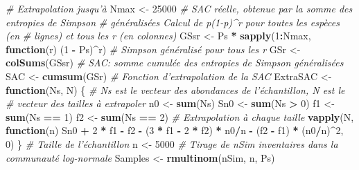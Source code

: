 \documentclass[
  11pt,
  french,
  a4paper,
  extrafontsizes,onecolumn,openright
  ]{memoir}
\newenvironment{Shaded}{\begin{snugshade}}{\end{snugshade}}
\newcommand{\CommentTok}[1]{\textcolor[rgb]{0.56,0.35,0.01}{\textit{#1}}}
\newcommand{\ControlFlowTok}[1]{\textcolor[rgb]{0.13,0.29,0.53}{\textbf{#1}}}
\newcommand{\DecValTok}[1]{\textcolor[rgb]{0.00,0.00,0.81}{#1}}
\newcommand{\KeywordTok}[1]{\textcolor[rgb]{0.13,0.29,0.53}{\textbf{#1}}}
\newcommand{\NormalTok}[1]{#1}
\newcommand{\OperatorTok}[1]{\textcolor[rgb]{0.81,0.36,0.00}{\textbf{#1}}}
\newcommand{\StringTok}[1]{\textcolor[rgb]{0.31,0.60,0.02}{#1}}
\begin{document}
\begin{Shaded}
\begin{Highlighting}[]
\CommentTok{# Extrapolation jusqu'à}
\NormalTok{Nmax <-}\StringTok{ }\DecValTok{25000}
\CommentTok{# SAC réelle, obtenue par la somme des entropies de Simpson}
\CommentTok{# généralisées Calcul de p(1-p)^r pour toutes les espèces (en}
\CommentTok{# lignes) et tous les r (en colonnes)}
\NormalTok{GSsr <-}\StringTok{ }\NormalTok{Ps }\OperatorTok{*}\StringTok{ }\KeywordTok{sapply}\NormalTok{(}\DecValTok{1}\OperatorTok{:}\NormalTok{Nmax, }\ControlFlowTok{function}\NormalTok{(r) (}\DecValTok{1} \OperatorTok{-}\StringTok{ }\NormalTok{Ps)}\OperatorTok{^}\NormalTok{r)}
\CommentTok{# Simpson généralisé pour tous les r}
\NormalTok{GSr <-}\StringTok{ }\KeywordTok{colSums}\NormalTok{(GSsr)}
\CommentTok{# SAC: somme cumulée des entropies de Simpson généralisées}
\NormalTok{SAC <-}\StringTok{ }\KeywordTok{cumsum}\NormalTok{(GSr)}
\CommentTok{# Fonction d'extrapolation de la SAC}
\NormalTok{ExtraSAC <-}\StringTok{ }\ControlFlowTok{function}\NormalTok{(Ns, N) \{}
    \CommentTok{# Ns est le vecteur des abondances de l'échantillon, N est le}
    \CommentTok{# vecteur des tailles à extrapoler}
\NormalTok{    n0 <-}\StringTok{ }\KeywordTok{sum}\NormalTok{(Ns)}
\NormalTok{    Sn0 <-}\StringTok{ }\KeywordTok{sum}\NormalTok{(Ns }\OperatorTok{>}\StringTok{ }\DecValTok{0}\NormalTok{)}
\NormalTok{    f1 <-}\StringTok{ }\KeywordTok{sum}\NormalTok{(Ns }\OperatorTok{==}\StringTok{ }\DecValTok{1}\NormalTok{)}
\NormalTok{    f2 <-}\StringTok{ }\KeywordTok{sum}\NormalTok{(Ns }\OperatorTok{==}\StringTok{ }\DecValTok{2}\NormalTok{)}
    \CommentTok{# Extrapolation à chaque taille}
    \KeywordTok{vapply}\NormalTok{(N, }\ControlFlowTok{function}\NormalTok{(n) Sn0 }\OperatorTok{+}\StringTok{ }\DecValTok{2} \OperatorTok{*}\StringTok{ }\NormalTok{f1 }\OperatorTok{-}\StringTok{ }\NormalTok{f2 }\OperatorTok{-}\StringTok{ }\NormalTok{(}\DecValTok{3} \OperatorTok{*}\StringTok{ }\NormalTok{f1 }\OperatorTok{-}\StringTok{ }\DecValTok{2} \OperatorTok{*}\StringTok{ }\NormalTok{f2) }\OperatorTok{*}\StringTok{ }
\StringTok{        }\NormalTok{n0}\OperatorTok{/}\NormalTok{n }\OperatorTok{-}\StringTok{ }\NormalTok{(f2 }\OperatorTok{-}\StringTok{ }\NormalTok{f1) }\OperatorTok{*}\StringTok{ }\NormalTok{(n0}\OperatorTok{/}\NormalTok{n)}\OperatorTok{^}\DecValTok{2}\NormalTok{, }\DecValTok{0}\NormalTok{)}
\NormalTok{\}}
\CommentTok{# Taille de l'échantillon}
\NormalTok{n <-}\StringTok{ }\DecValTok{5000}
\CommentTok{# Tirage de nSim inventaires dans la communauté log-normale}
\NormalTok{Samples <-}\StringTok{ }\KeywordTok{rmultinom}\NormalTok{(nSim, n, Ps)}

\end{Highlighting}
\end{Shaded}
\end{document}

